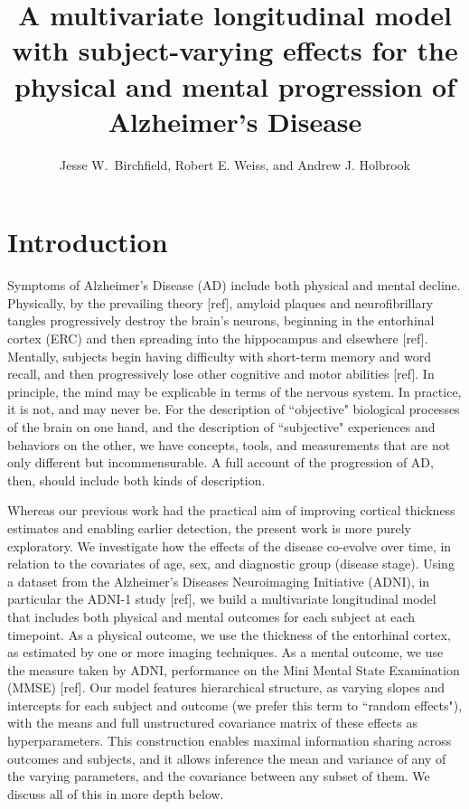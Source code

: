 \documentclass[12pt]{article}
\title{A multivariate longitudinal model with subject-varying effects for the physical and mental progression of Alzheimer's Disease}
\author{Jesse W.~Birchfield, Robert E. Weiss, and Andrew J. Holbrook}
\begin{document}
\maketitle

\pagebreak
\section{Introduction}

Symptoms of Alzheimer's Disease (AD) include both physical and mental decline. Physically, by the prevailing theory {\color{teal}[ref]}, amyloid plaques and neurofibrillary tangles progressively destroy the brain's neurons, beginning in the entorhinal cortex (ERC) and then spreading into the hippocampus and elsewhere {\color{teal}[ref]}. Mentally, subjects begin having difficulty with short-term memory and word recall, and then progressively lose other cognitive and motor abilities {\color{teal}[ref]}. In principle, the mind may be explicable in terms of the nervous system. In practice, it is not, and may never be. For the description of ``objective" biological processes of the brain on one hand, and the description of ``subjective" experiences and behaviors on the other, we have concepts, tools, and measurements that are not only different but incommensurable. A full account of the progression of AD, then, should include both kinds of description. 

Whereas our previous work had the practical aim of improving cortical thickness estimates and enabling earlier detection, the present work is more purely exploratory. We investigate how the effects of the disease co-evolve over time, in relation to the covariates of age, sex, and diagnostic group (disease stage). Using a dataset from the Alzheimer's Diseases Neuroimaging Initiative (ADNI), in particular the ADNI-1 study {\color{teal}[ref]}, we build a multivariate longitudinal model that includes both physical and mental outcomes for each subject at each timepoint. As a physical outcome, we use the thickness of the entorhinal cortex, as estimated by one or more imaging techniques. As a mental outcome, we use the measure taken by ADNI, performance on the Mini Mental State Examination (MMSE) {\color{teal}[ref]}. Our model features hierarchical structure, as varying slopes and intercepts for each subject and outcome (we prefer this term to ``random effects"), with the means and full unstructured covariance matrix of these effects as hyperparameters. This construction enables maximal information sharing across outcomes and subjects, and it allows inference the mean and variance of any of the varying parameters, and the covariance between any subset of them. We discuss all of this in more depth below.
\end{document}
